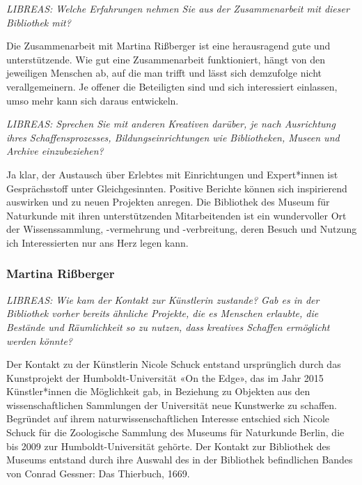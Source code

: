 \documentclass[a4paper,
fontsize=11pt,
oneside,
numbers=noperiodatend,
parskip=half-,
bibliography=totoc,
final
]{scrartcl}
\begin{document}
\emph{LIBREAS: Welche Erfahrungen nehmen Sie aus der Zusammenarbeit mit
dieser Bibliothek mit?}

Die Zusammenarbeit mit Martina Rißberger ist eine herausragend gute und
unterstützende. Wie gut eine Zusammenarbeit funktioniert, hängt von den
jeweiligen Menschen ab, auf die man trifft und lässt sich demzufolge
nicht verallgemeinern. Je offener die Beteiligten sind und sich
interessiert einlassen, umso mehr kann sich daraus entwickeln.

\emph{LIBREAS: Sprechen Sie mit anderen Kreativen darüber, je nach
Ausrichtung ihres Schaffensprozesses, Bildungseinrichtungen wie
Bibliotheken, Museen und Archive einzubeziehen?}

Ja klar, der Austausch über Erlebtes mit Einrichtungen und Expert*innen
ist Gesprächsstoff unter Gleichgesinnten. Positive Berichte können sich
inspirierend auswirken und zu neuen Projekten anregen. Die Bibliothek
des Museum für Naturkunde mit ihren unterstützenden Mitarbeitenden ist
ein wundervoller Ort der Wissenssammlung, -vermehrung und -verbreitung,
deren Besuch und Nutzung ich Interessierten nur ans Herz legen kann.

\hypertarget{martina-riuxdfberger}{%
\subsubsection{Martina Rißberger}\label{martina-riuxdfberger}}

\emph{LIBREAS: Wie kam der Kontakt zur Künstlerin zustande? Gab es in
der Bibliothek vorher bereits ähnliche Projekte, die es Menschen
erlaubte, die Bestände und Räumlichkeit so zu nutzen, dass kreatives
Schaffen ermöglicht werden könnte?}

Der Kontakt zu der Künstlerin Nicole Schuck entstand ursprünglich durch
das Kunstprojekt der Humboldt-Universität «On the Edge», das im Jahr
2015 Künstler*innen die Möglichkeit gab, in Beziehung zu Objekten aus
den wissenschaftlichen Sammlungen der Universität neue Kunstwerke zu
schaffen. Begründet auf ihrem naturwissenschaftlichen Interesse
entschied sich Nicole Schuck für die Zoologische Sammlung des Museums
für Naturkunde Berlin, die bis 2009 zur Humboldt-Universität gehörte.
Der Kontakt zur Bibliothek des Museums entstand durch ihre Auswahl des
in der Bibliothek befindlichen Bandes von Conrad Gessner: Das Thierbuch,
1669.
\end{document}
